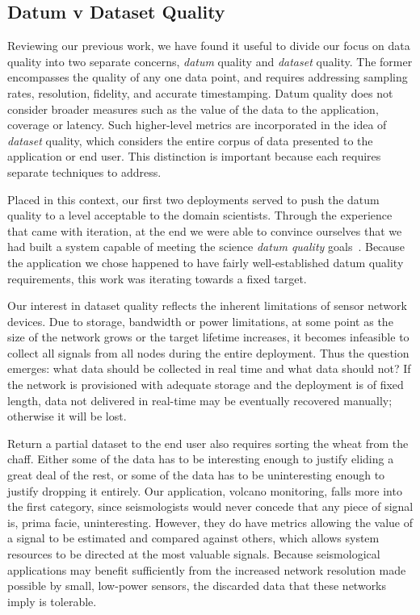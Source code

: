 \subsection{Datum v Dataset Quality}
\label{sec-datavdatumquality}

Reviewing our previous work, we have found it useful to divide our focus on
data quality into two separate concerns, \textit{datum} quality and
\textit{dataset} quality.  The former encompasses the quality of any one data
point, and requires addressing sampling rates, resolution, fidelity, and
accurate timestamping. Datum quality does not consider broader measures such
as the value of the data to the application, coverage or latency.  Such
higher-level metrics are incorporated in the idea of \textit{dataset}
quality, which considers the entire corpus of data presented to the
application or end user. This distinction is important because each requires
separate techniques to address.

Placed in this context, our first two deployments served to push the datum
quality to a level acceptable to the domain scientists.  Through the
experience that came with iteration, at the end we were able to convince
ourselves that we had built a system capable of meeting the science
\textit{datum quality} goals~\cite{volcano-osdi06}. Because the
application we chose happened to have fairly well-established datum quality
requirements, this work was iterating towards a fixed target.

Our interest in dataset quality reflects the inherent limitations of sensor
network devices.  Due to storage, bandwidth or power limitations, at some
point as the size of the network grows or the target lifetime increases, it
becomes infeasible to collect all signals from all nodes during the entire
deployment.  Thus the question emerges: what data should be collected in real
time and what data should not?  If the network is provisioned with adequate
storage and the deployment is of fixed length, data not delivered in
real-time may be eventually recovered manually; otherwise it will be lost.

Return a partial dataset to the end user also requires sorting the wheat from
the chaff.  Either some of the data has to be interesting enough to justify
eliding a great deal of the rest, or some of the data has to be uninteresting
enough to justify dropping it entirely.  Our application, volcano monitoring,
falls more into the first category, since seismologists would never concede
that any piece of signal is, prima facie, uninteresting. However,
they do have metrics allowing the value of a signal to be estimated and
compared against others, which allows system resources to be directed at the
most valuable signals.  Because seismological applications may benefit
sufficiently from the increased network resolution made possible by small,
low-power sensors, the discarded data that these networks imply is tolerable.

